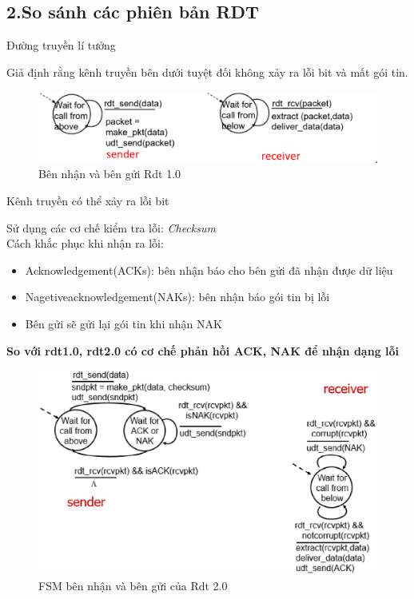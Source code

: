 \documentclass[12pt,a4paper]{article}
\begin{document}
\subsection*{2.\;So sánh các phiên bản RDT}

\begin{description}[font=$\bullet$~\normalfont\scshape\color{red!50!black}]
    \item [Rdt 1.0] Đường truyền lí tưởng
\end{description}
Giả định rằng kênh truyền bên dưới tuyệt đối không xảy ra lỗi bit và mất gói tin. \\
\begin{figure}[h]
    \centering
    \includegraphics[scale=0.45]{rdt1.eps}
    \caption{Bên nhận và bên gửi Rdt 1.0}
\end{figure}

\begin{description}[font=$\bullet$~\normalfont\scshape\color{red!50!black}]
    \item [Rdt 2.0] Kênh truyền có thể xảy ra lỗi bit
\end{description}
Sử dụng các cơ chế kiểm tra lỗi: \textit{Checksum} \\
Cách khắc phục khi nhận ra lỗi:
\begin{itemize}
    \item Acknowledgement(ACKs): bên nhận báo cho bên gửi đã nhận được dữ liệu
    \item Nagetiveacknowledgement(NAKs): bên nhận báo gói tin bị lỗi
    \item Bên gửi sẽ gửi lại gói tin khi nhận NAK
\end{itemize}
\textbf{So với rdt1.0, rdt2.0 có cơ chế phản hồi ACK, NAK để nhận dạng lỗi}
\begin{figure}[h]
    \centering
    \includegraphics[scale=0.45]{rdt2.eps}
    \caption{FSM bên nhận và bên gửi của Rdt 2.0}
\end{figure}
\end{document}
